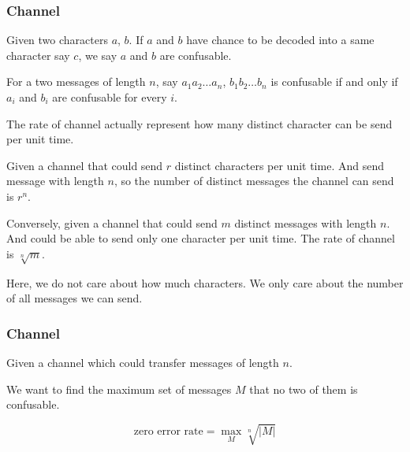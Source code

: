 \documentclass{beamer}
\begin{document}
                  \begin{frame}
                        \frametitle{Channel}
                        \begin{definition}[confusable]
                              Given two characters $a$, $b$. If $a$ and $b$ have chance to be decoded into a same character say $c$, we say $a$ and $b$ are confusable.

                              For a two messages of length $n$, say $a_{1}a_{2}\dots a_{n}$, $b_{1}b_{2}\dots b_{n}$ is confusable if and only if $a_{i}$ and $b_{i}$ are confusable for every $i$.
                        \end{definition}
                        \pause
                        \begin{definition}
                              The rate of channel actually represent how many distinct character can be send per unit time.

                              Given a channel that could send $r$ distinct characters per unit time. And send message with length $n$, so the number of distinct messages the channel can send is $r^{n}$.

                              \pause

                              Conversely, given a channel that could send $m$ distinct messages with length $n$.
                              And could be able to send only one character per unit time.
                              The rate of channel is $\sqrt[n]{m}$.

                              Here, we do not care about how much characters. We only care about the number of all messages we can send.
                              
                        \end{definition}
                  \end{frame}

                  \begin{frame}
                        \frametitle{Channel}
                        \begin{definition}
                              Given a channel which could transfer messages of length $n$.

                              We want to find the maximum set of messages $M$ that no two of them is confusable.

                              \begin{equation}
                                    \text{zero error rate} = \max_{M} \sqrt[n]{|M|}
                              \end{equation}
                        \end{definition}
                  \end{frame}
\end{document}
